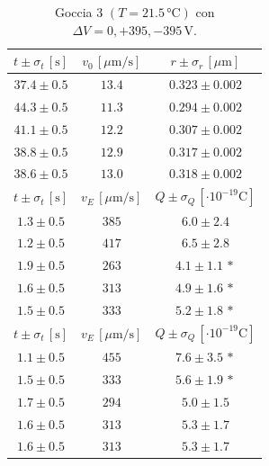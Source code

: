 \documentclass[]{article}
\begin{document}
    \begin{table}[H]
        \centering
        \begin{tabular}{||c|c|c||}
            \hline
            $t \pm \sigma_t \, \left[\text{s}\right]$ & $v_0 \, \left[\mu\text{m/s}\right]$ & $r \pm \sigma_r \, \left[\mu\text{m}\right]$ \\\hline
            \hline
            $37.4 \pm 0.5$ & $13.4$ & $0.323 \pm 0.002$ \\\hline
            $44.3 \pm 0.5$ & $11.3$ & $0.294 \pm 0.002$ \\\hline
            $41.1 \pm 0.5$ & $12.2$ & $0.307 \pm 0.002$ \\\hline
            $38.8 \pm 0.5$ & $12.9$ & $0.317 \pm 0.002$ \\\hline
            $38.6 \pm 0.5$ & $13.0$ & $0.318 \pm 0.002$ \\\hline
            \hline
            $t \pm \sigma_t \, \left[\text{s}\right]$ & $v_E \, \left[\mu\text{m/s}\right]$ & $Q \pm \sigma_Q \, \left[\cdot 10^{-19} \text{C}\right]$ \\\hline
            \hline
            $1.3 \pm 0.5$ & $385$ & $6.0 \pm 2.4$ \\\hline
            $1.2 \pm 0.5$ & $417$ & $6.5 \pm 2.8$ \\\hline
            $1.9 \pm 0.5$ & $263$ & $4.1 \pm 1.1\,\ast$ \\\hline
            $1.6 \pm 0.5$ & $313$ & $4.9 \pm 1.6\,\ast$ \\\hline
            $1.5 \pm 0.5$ & $333$ & $5.2 \pm 1.8\,\ast$ \\\hline
            \hline
            $t \pm \sigma_t \, \left[\text{s}\right]$ & $v_E \, \left[\mu\text{m/s}\right]$ & $Q \pm \sigma_Q \, \left[\cdot 10^{-19} \text{C}\right]$ \\\hline
            \hline
            $1.1 \pm 0.5$ & $455$ & $7.6 \pm 3.5\,\ast$ \\\hline
            $1.5 \pm 0.5$ & $333$ & $5.6 \pm 1.9\,\ast$ \\\hline
            $1.7 \pm 0.5$ & $294$ & $5.0 \pm 1.5$ \\\hline
            $1.6 \pm 0.5$ & $313$ & $5.3 \pm 1.7$ \\\hline
            $1.6 \pm 0.5$ & $313$ & $5.3 \pm 1.7$ \\\hline
        \end{tabular}
        \caption{Goccia 3 $\left(T = 21.5\, \text{°C}\right)$ con $\Delta V = 0,+395,-395 \,\text{V}$.}
        \label{goccia-3}
    \end{table}
\end{document}
